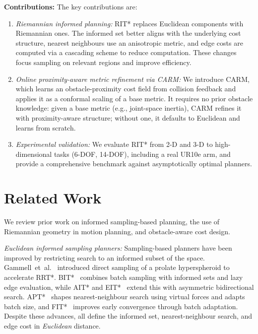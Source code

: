\documentclass[journal]{IEEEtran}
\newcommand{\rev}[1]{#1}%
\newcommand{\revB}[1]{#1}%
\begin{document}
\textbf{Contributions:}
The key contributions are:
\begin{enumerate}

\item \textit{Riemannian informed planning:}
RIT* replaces Euclidean components with Riemannian ones. \rev{The informed set better aligns with the underlying cost structure, nearest neighbours use an anisotropic metric, and edge costs are computed via a cascading scheme to reduce computation.} These changes focus sampling on relevant regions and improve efficiency.
\item \textit{Online proximity-aware metric refinement via CARM:}
We introduce CARM, which learns an obstacle-proximity cost field from collision feedback and applies it as a conformal scaling of a base metric. It requires no prior obstacle knowledge: given a base metric (e.g., joint-space inertia), CARM refines it with proximity-aware structure; without one, it defaults to Euclidean and learns from scratch.

\item \textit{Experimental validation:}
We evaluate RIT* from \mbox{2-D} and \mbox{3-D} to high-dimensional tasks (6-DOF, 14-DOF), including a real \revB{UR10e} arm, and provide a comprehensive benchmark against asymptotically optimal planners.
\end{enumerate}
\vspace{-3mm}
\section{Related Work}\label{sec:related}

We review prior work on informed sampling-based planning, the use of
Riemannian geometry in motion planning, and obstacle-aware cost design.

\textit{Euclidean informed sampling planners:}
Sampling-based planners have been improved by restricting search to an
informed subset of the space. Gammell~et~al.~\cite{Gammell2018}
introduced direct sampling of a prolate hyperspheroid to accelerate
RRT*. BIT*~\cite{Gammell2020} combines batch sampling with informed sets
and lazy edge evaluation, while AIT* and EIT*~\cite{Strub2022} extend
this with asymmetric bidirectional search. APT*~\cite{APT2025} shapes
nearest-neighbour search using virtual forces and adapts batch size, and
FIT*~\cite{FIT2024} improves early convergence through batch adaptation.
Despite these advances, all define the informed set, nearest-neighbour
search, and edge cost in \emph{Euclidean} distance.
\end{document}
